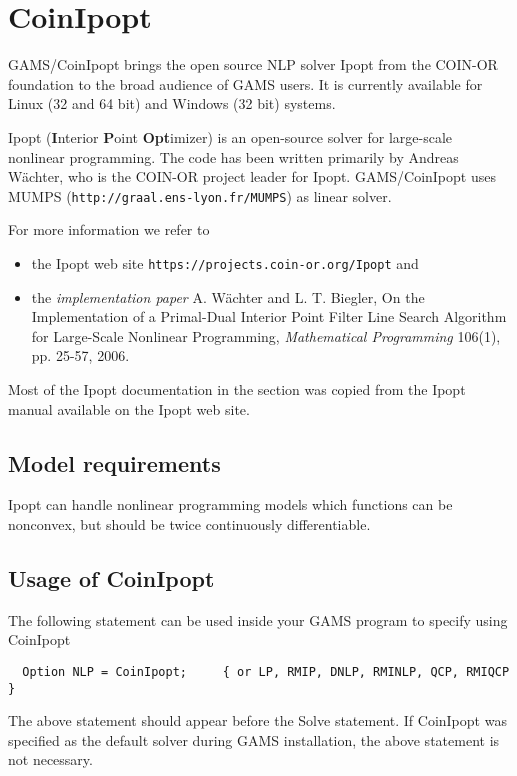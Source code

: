 




\section{CoinIpopt}

GAMS/CoinIpopt brings the open source NLP solver Ipopt from the COIN-OR foundation to the broad audience of GAMS users.
It is currently available for Linux (32 and 64 bit) and Windows (32 bit) systems.

Ipopt (\textbf{I}nterior \textbf{P}oint \textbf{Opt}imizer) is an open-source solver for large-scale nonlinear programming.
The code has been written primarily by Andreas W\"achter, who is the COIN-OR project leader for Ipopt.
GAMS/CoinIpopt uses MUMPS (\texttt{http://graal.ens-lyon.fr/MUMPS}) as linear solver.

For more information we refer to
\begin{itemize}
\item the Ipopt web site \texttt{https://projects.coin-or.org/Ipopt} and
\item the \emph{implementation paper} A. W\"achter and L. T. Biegler, On the Implementation of a Primal-Dual Interior Point Filter Line Search Algorithm for Large-Scale Nonlinear Programming, \emph{Mathematical Programming} 106(1), pp. 25-57, 2006.
\end{itemize}
Most of the Ipopt documentation in the section was copied from the Ipopt manual available on the Ipopt web site.

\subsection{Model requirements}

Ipopt can handle nonlinear programming models which functions can be nonconvex, but should be twice continuously differentiable.

\subsection{Usage of CoinIpopt}

The following statement can be used inside your GAMS program to specify using CoinIpopt
\begin{verbatim}
  Option NLP = CoinIpopt;     { or LP, RMIP, DNLP, RMINLP, QCP, RMIQCP }
\end{verbatim}

The above statement should appear before the Solve statement.
If CoinIpopt was specified as the default solver during GAMS installation, the above statement is not necessary.

